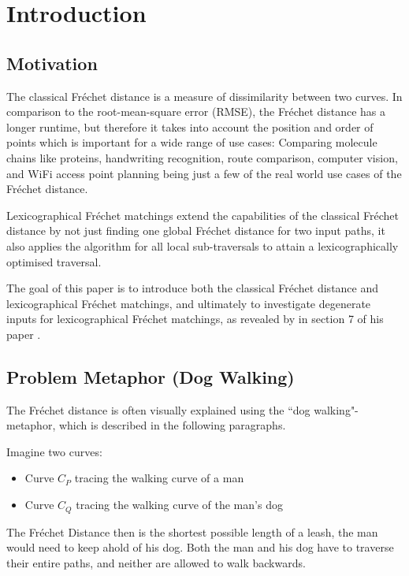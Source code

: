 \section{Introduction}

\subsection{Motivation}
	The classical Fréchet distance is a measure of dissimilarity between two curves. In comparison to the root-mean-square error (RMSE), the Fréchet distance has a longer runtime, but therefore it takes into account the position and order of points which is important for a wide range of use cases: Comparing molecule chains like proteins, handwriting recognition, route comparison, computer vision, and WiFi access point planning being just a few of the real world use cases of the Fréchet distance.
	
	Lexicographical Fréchet matchings extend the capabilities of the classical Fréchet distance by not just finding one global Fréchet distance for two input paths, it also applies the algorithm for all local sub-traversals to attain a lexicographically optimised traversal.
	
	The goal of this paper is to introduce both the classical Fréchet distance and lexicographical Fréchet matchings, and ultimately to investigate degenerate inputs for lexicographical Fréchet matchings, as revealed by \citeauthor{rotelex} in section 7 of his \citeyear{rotelex} paper \cite{rotelex}.
	

\subsection{Problem Metaphor (Dog Walking)} \label{dogwalking}

The Fréchet distance is often visually explained using the ``dog walking"-metaphor, which is described in the following paragraphs.

Imagine two curves:
\begin{itemize}
	\item Curve $C_P$ tracing the walking curve of a man
	\item Curve $C_Q$ tracing the walking curve of the man's dog
\end{itemize}

The Fréchet Distance then is the shortest possible length of a leash, the man would need to keep ahold of his dog. Both the man and his dog have to traverse their entire paths, and neither are allowed to walk backwards.


